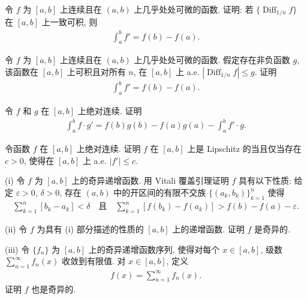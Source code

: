 \documentclass[../../main.tex]{subfiles}
\begin{document}
\begin{exercise}\label{exercise:ch06-50}
令 $f$ 为 $[a,b]$ 上连续且在 $(a,b)$ 上几乎处处可微的函数. 证明: 若 $\{\operatorname{Diff}_{1/n}f\}$ 在 $[a,b]$ 上一致可积, 则
\begin{align*}
\int_{a}^{b}f'=f(b)-f(a).
\end{align*}
\end{exercise}

\begin{exercise}\label{exercise:ch06-51}
令 $f$ 为 $[a,b]$ 上连续且在 $(a,b)$ 上几乎处处可微的函数. 假定存在非负函数 $g$, 该函数在 $[a,b]$ 上可积且对所有 $n$, 在 $[a,b]$ 上 a.e. $|\operatorname{Diff}_{1/n}f|\leqslant g$. 证明
\begin{align*}
\int_{a}^{b}f'=f(b)-f(a).
\end{align*}
\end{exercise}

\begin{exercise}\label{exercise:ch06-52}
令 $f$ 和 $g$ 在 $[a,b]$ 上绝对连续. 证明
\begin{align*}
\int_{a}^{b}f\cdot g'=f(b)g(b)-f(a)g(a)-\int_{a}^{b}f'\cdot g.
\end{align*}
\end{exercise}

\begin{exercise}\label{exercise:ch06-53}
令函数 $f$ 在 $[a,b]$ 上绝对连续. 证明 $f$ 在 $[a,b]$ 上是 Lipschitz 的当且仅当存在 $c>0$, 使得在 $[a,b]$ 上 a.e. $|f'|\leqslant c$.
\end{exercise}

\begin{exercise}\label{exercise:ch06-54}
(i) 令 $f$ 为 $[a,b]$ 上的奇异递增函数. 用 Vitali 覆盖引理证明 $f$ 具有以下性质: 给定 $\varepsilon>0$, $\delta>0$, 存在 $(a,b)$ 中的开区间的有限不交族 $\{(a_{k},b_{k})\}_{k=1}^{n}$ 使得
\begin{align*}
\sum_{k=1}^{n}[b_{k}-a_{k}]<\delta\quad\text{且}\quad\sum_{k=1}^{n}[f(b_{k})-f(a_{k})]>f(b)-f(a)-\varepsilon.
\end{align*}

(ii) 令 $f$ 为具有 (i) 部分描述的性质的 $[a,b]$ 上的递增函数. 证明 $f$ 是奇异的.

(iii) 令 $\{f_{n}\}$ 为 $[a,b]$ 上的奇异递增函数序列, 使得对每个 $x\in[a,b]$, 级数 $\sum_{n=1}^{\infty}f_{n}(x)$ 收敛到有限值. 对 $x\in[a,b]$, 定义
\begin{align*}
f(x)=\sum_{n=1}^{\infty}f_{n}(x).
\end{align*}
证明 $f$ 也是奇异的.
\end{exercise}
\end{document}
